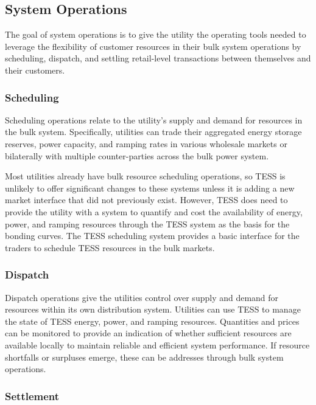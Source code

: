 \documentclass[10pt,twocolumn]{article}
\begin{document}
\subsection{System Operations}

The goal of system operations is to give the utility the operating tools needed to leverage the flexibility of customer resources in their bulk system operations by scheduling, dispatch, and settling retail-level transactions between themselves and their customers.

\subsubsection{Scheduling}

Scheduling operations relate to the utility's supply and demand for resources in the bulk system.  Specifically, utilities can trade their aggregated energy storage reserves, power capacity, and ramping rates in various wholesale markets or bilaterally with multiple counter-parties across the bulk power system.  

Most utilities already have bulk resource scheduling operations, so TESS is unlikely to offer significant changes to these systems unless it is adding a new market interface that did not previously exist.  However, TESS does need to provide the utility with a system to quantify and cost the availability of energy, power, and ramping resources through the TESS system as the basis for the bonding curves.  The TESS scheduling system provides a basic interface for the traders to schedule TESS resources in the bulk markets.

\subsubsection{Dispatch}

Dispatch operations give the utilities control over supply and demand for resources within its own distribution system.  Utilities can use TESS to manage the state of TESS energy, power, and ramping resources. Quantities and prices can be monitored to provide an indication of whether sufficient resources are available locally to maintain reliable and efficient system performance.  If resource shortfalls or surpluses emerge, these can be addresses through bulk system operations.

\subsubsection{Settlement}
\end{document}
